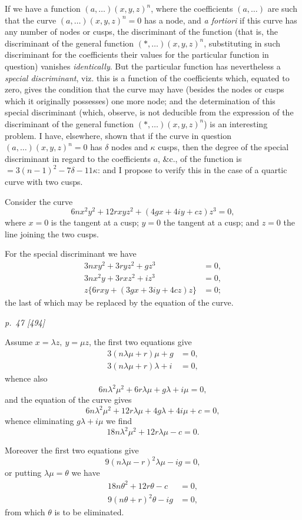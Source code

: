 ﻿\documentclass[11pt,a4paper]{article}
\theoremstyle{plain}
\theoremstyle{definition}
\begin{document}
If we have a function \((a,\ldots)(x,y,z)^n\), where the coefficients
\((a,\ldots)\) are such that the curve \((a,\ldots)(x,y,z)^n=0\) has a
node, and \textit{a fortiori} if this curve has any number of nodes or
cusps, the discriminant of the function (that is, the discriminant of the
general function \((*,\ldots)(x,y,z)^n\), substituting in such
discriminant for the coefficients their values for the particular function
in question) vanishes \textit{identically}. But the particular function
has nevertheless a \textit{special discriminant}, viz. this is a function
of the coefficients which, equated to zero, gives the condition that the
curve may have (besides the nodes or cusps which it originally possesses)
one more node; and the determination of this special discriminant (which,
observe, is not deducible from the expression of the discriminant of the
general function \((*,\ldots)(x,y,z)^n\)) is an interesting problem. I
have, elsewhere, shown that if the curve in question
\((a,\ldots)(x,y,z)^n=0\) has \(\delta\) nodes and \(\kappa\) cusps, then
the degree of the special discriminant in regard to the coefficients
\(a\), \&c., of the function is \(=3(n-1)^2-7\delta-11\kappa\): and I
propose to verify this in the case of a quartic curve with two cusps.

Consider the curve
\[
6n x^2y^2+12rxy z^2+(4gx+4iy+cz)z^3=0,
\]
where \(x=0\) is the tangent at a cusp; \(y=0\) the tangent at a cusp; and
\(z=0\) the line joining the two cusps.

For the special discriminant we have
\[
\begin{aligned}
3nxy^2+3ryz^2+gz^3&=0,\\
3nx^2y+3rxz^2+iz^3&=0,\\
z\{6rxy+(3gx+3iy+4cz)z\}&=0;
\end{aligned}
\]
the last of which may be replaced by the equation of the curve.

\textit{p.~47 [494]}

Assume \(x=\lambda z,\ y=\mu z\), the first two equations give
\[
\begin{aligned}
3(n\lambda\mu+r)\mu+g&=0,\\
3(n\lambda\mu+r)\lambda+i&=0,
\end{aligned}
\]
whence also
\[
6n\lambda^2\mu^2+6r\lambda\mu+g\lambda+i\mu=0,
\]
and the equation of the curve gives
\[
6n\lambda^2\mu^2+12r\lambda\mu+4g\lambda+4i\mu+c=0,
\]
whence eliminating \(g\lambda+i\mu\) we find
\[
18n\lambda^2\mu^2+12r\lambda\mu-c=0.
\]

Moreover the first two equations give
\[
9(n\lambda\mu-r)^2\lambda\mu-ig=0,
\]
or putting \(\lambda\mu=\theta\) we have
\[
\begin{aligned}
18n\theta^2+12r\theta-c&=0,\\
9(n\theta+r)^2\theta-ig&=0,
\end{aligned}
\]
from which \(\theta\) is to be eliminated.
\end{document}
